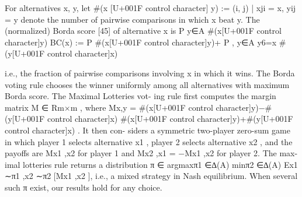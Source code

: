 \documentclass[10pt]{article}
\begin{document}
\begin{ReviewVerbatim}
For alternatives x, y, let #(x [U+001F control character] y) := {(i, j) | xji = x, yij = y} denote the number of pairwise
comparisons in which x beat y. The (normalized) Borda score [45] of alternative x is
                                                       P
                                                         y∈A #(x[U+001F control character]y)
                                   BC(x) := P         #(x[U+001F control character]y)+
                                                              P             ,
                                                  y∈A           y6=x #(y[U+001F control character]x)


i.e., the fraction of pairwise comparisons involving x in which it wins. The Borda voting rule chooses
the winner uniformly among all alternatives with maximum Borda score. The Maximal Lotteries vot-
ing rule first computes the margin matrix M ∈ Rm×m , where Mx,y = #(x[U+001F control character]y)−#(y[U+001F control character]x)
                                                                          #(x[U+001F control character]y)+#(y[U+001F control character]x) . It then con-
siders a symmetric two-player zero-sum game in which player 1 selects alternative x1 , player 2 selects
alternative x2 , and the payoffs are Mx1 ,x2 for player 1 and Mx2 ,x1 = −Mx1 ,x2 for player 2. The max-
imal lotteries rule returns a distribution π ∈ argmaxπ1 ∈∆(A) minπ2 ∈∆(A) Ex1 ∼π1 ,x2 ∼π2 [Mx1 ,x2 ],
i.e., a mixed strategy in Nash equilibrium. When several such π exist, our results hold for any choice.
\end{ReviewVerbatim}
\end{document}
